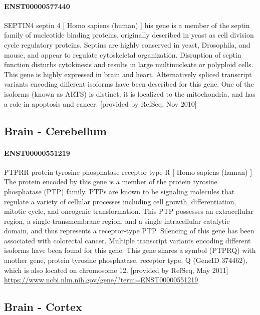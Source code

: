 \documentclass[
]{article}
\begin{document}
\hypertarget{enst00000577440}{%
\paragraph{ENST00000577440}\label{enst00000577440}}

SEPTIN4 septin 4 {[} Homo sapiens (human) {]} his gene is a member of
the septin family of nucleotide binding proteins, originally described
in yeast as cell division cycle regulatory proteins. Septins are highly
conserved in yeast, Drosophila, and mouse, and appear to regulate
cytoskeletal organization. Disruption of septin function disturbs
cytokinesis and results in large multinucleate or polyploid cells. This
gene is highly expressed in brain and heart. Alternatively spliced
transcript variants encoding different isoforms have been described for
this gene. One of the isoforms (known as ARTS) is distinct; it is
localized to the mitochondria, and has a role in apoptosis and cancer.
{[}provided by RefSeq, Nov 2010{]}

\hypertarget{brain---cerebellum}{%
\subsection{Brain - Cerebellum}\label{brain---cerebellum}}

\hypertarget{enst00000551219}{%
\paragraph{ENST00000551219}\label{enst00000551219}}

PTPRR protein tyrosine phosphatase receptor type R {[} Homo sapiens
(human) {]} The protein encoded by this gene is a member of the protein
tyrosine phosphatase (PTP) family. PTPs are known to be signaling
molecules that regulate a variety of cellular processes including cell
growth, differentiation, mitotic cycle, and oncogenic transformation.
This PTP possesses an extracellular region, a single transmembrane
region, and a single intracellular catalytic domain, and thus represents
a receptor-type PTP. Silencing of this gene has been associated with
colorectal cancer. Multiple transcript variants encoding different
isoforms have been found for this gene. This gene shares a symbol
(PTPRQ) with another gene, protein tyrosine phosphatase, receptor type,
Q (GeneID 374462), which is also located on chromosome 12. {[}provided
by RefSeq, May 2011{]}
\url{https://www.ncbi.nlm.nih.gov/gene/?term=ENST00000551219}

\hypertarget{brain---cortex}{%
\subsection{Brain - Cortex}\label{brain---cortex}}
\end{document}
